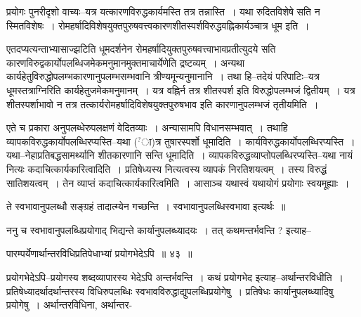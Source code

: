 \documentclass[article,12pt,a4paper]{memoir}
\newcommand{\unclear}[1]{($^{?}$#1)}
\begin{document}
	  \endgroup
	

	  \pstart प्रयोगः पुनरीदृशो वाच्यः--यत्र यत्कारणविरुद्धकार्यमस्ति तत्र तन्नास्ति । यथा रुदितविशेषे सति न स्मितविशेषः । रोमहर्षादिविशेषयुक्तपुरुषवत्त्वकारणशीतस्पर्शविरुद्धवह्निकार्यञ्चात्र धूम इति ।
	\pend
      

	  \pstart एतदप्यत्यन्ताभ्यासाज्झटिति धूमदर्शनेन रोमहर्षादियुक्तपुरुषवत्त्वाभावप्रतीत्युदये सति कारणविरुद्वकार्योपलब्धिजमेकमनुमानमुक्तमाचार्येणेति द्रष्टव्यम् । अन्यथा कार्यहेतुविरुद्धोपलम्भकारणानुपलम्भसम्भवानि त्रीण्यमून्यनुमानानि । तथा हि--तदेयं परिपाटिः--यत्र धूमस्तत्राग्निरिति कार्यहेतुजमेकमनुमानम् । यत्र वह्निर्न तत्र शीतस्पर्श इति विरुद्धोपलम्भजं द्वितीयम् । यत्र शीतस्पर्शाभावो न तत्र तत्कार्यरोमहर्षादिविशेषयुक्तपुरुषभाव इति कारणानुपलम्भजं तृतीयमिति ।
	\pend
      

	  \pstart एते च प्रकारा अनुपलब्धेरुपलक्षणं वेदितव्याः । अन्यासामपि विधानसम्भवात् । तथाहि व्यापकविरुद्धकार्योपलब्धिरप्यस्ति--यथा \unclear{ा}त्र तुषारस्पर्शो धूमादिति । कार्यविरुद्धकार्योपलब्धिरप्यस्ति । यथा--नेहाप्रतिबद्धसामर्थ्यानि शीतकारणानि सन्ति धूमादिति । व्यापकविरुद्धव्याप्तोपलब्धिरप्यस्ति--यथा नायं नित्यः कदाचित्कार्यकारित्वादिति । प्रतिषेध्यस्य नित्यत्वस्य व्यापकं निरतिशयत्वम् । तस्य विरुद्धं सातिशयत्वम् । तेन व्याप्तं कदाचित्कार्यकारित्वमिति । आसाञ्च यथास्वं यथायोगं प्रयोगाः स्वयमूह्याः ।
	\pend
	  \bigskip
	  \begingroup
	

	  \pstart ते स्वभावानुपलब्धौ सङ्ग्रहं तादात्म्येन गच्छन्ति । स्वभावानुपलब्धिस्वभावा इत्यर्थः ॥
	\pend
        

	  \pstart ननु च स्वभावानुपलब्धिप्रयोगाद् भिद्यन्ते कार्यानुपलब्ध्यादयः । तत् कथमन्तर्भवन्ति ? इत्याह--
	\pend
        
	  \bigskip
	  \begingroup
	

	  \pstart पारम्पर्येणार्थान्तरविधिप्रतिपेधाभ्यां प्रयोगभेदेऽपि ॥ ४३ ॥
	\pend
      
	  \endgroup
	 

	  \pstart प्रयोगभेदेऽपि--प्रयोगस्य शब्दव्यापारस्य भेदेऽपि अन्तर्भवन्ति । कथं प्रयोगभेद इत्याह--अर्थान्तरविधीति । प्रतिषेध्यादर्थादर्थान्तरस्य विधिरुपलब्धिः स्वभावविरुद्धाद्युपलब्धिप्रयोगेषु । प्रतिषेधः कार्यानुपलब्ध्यादिषु प्रयोगेषु । अर्थान्तरविधिना, अर्थान्तर-
	\pend
      
\end{document}
